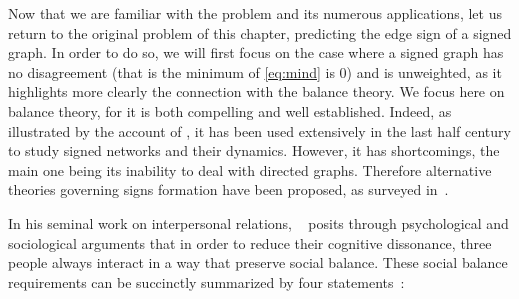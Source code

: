 Now that we are familiar with the \pcc{} problem and its numerous applications, let us return to the
original problem of this chapter, predicting the edge sign of a signed graph. In order to do so, we
will first focus on the case where a signed graph has no disagreement (that is the minimum of
\eqref{eq:mind} is $0$) and is unweighted, as it highlights more clearly the connection with the
balance theory. We focus here on balance theory, for it is both compelling and well established.
Indeed, as illustrated by the account of \textcite{CSBalanceSurvey15}, it has been used extensively
in the last half century to study signed networks and their dynamics.
However, it has shortcomings, the main one being its inability to deal with directed graphs.
Therefore alternative theories governing signs formation have been proposed, as surveyed
in~\autocite{Yap2015}.

In his seminal work on interpersonal relations,
\citeauthor*{Heider46}~\autocites{Heider46}{HeiderBook58} posits through
psychological and sociological arguments that in order to reduce their cognitive dissonance, three
people always interact in a way that preserve social balance. These social balance requirements can be
succinctly summarized by four statements~\autocite{HeiderBook58}:

